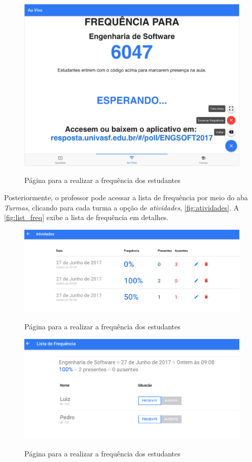 \begin{figure}[h]
  \centering
  \caption{Página para a realizar a frequência dos estudantes}
  \includegraphics[scale=.45]{imagens/telas/live_freq}
  \doautor
  \label{fig:live_freq}
\end{figure}

Posteriormente, o professor pode acessar a lista de frequência por meio do aba \textit{Turmas},
clicando para cada turma a opção de \textit{atividades}, \autoref{fig:atividades}. A \autoref{fig:list_freq} exibe a
lista de frequência em detalhes.

\begin{figure}[h]
  \centering
  \caption{Página para a realizar a frequência dos estudantes}
  \includegraphics[scale=.45]{imagens/telas/atividades}
  \doautor
  \label{fig:atividades}
\end{figure}

\begin{figure}[h]
  \centering
  \caption{Página para a realizar a frequência dos estudantes}
  \includegraphics[scale=.45]{imagens/telas/list_freq}
  \doautor
  \label{fig:list_freq}
\end{figure}


